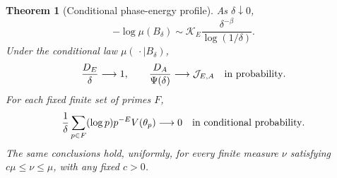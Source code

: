 \documentclass[11pt,letterpaper]{article}
\newtheorem{theorem}{Theorem}[section]
\theoremstyle{definition}
\theoremstyle{remark}
\newcommand{\1}{\mathbf 1}
\begin{document}
\begin{theorem}[Conditional phase-energy profile]
\label{p04:thm:conditional-energy-profile}
As $\delta\downarrow0$,
\begin{equation}\label{p04:eq:exact-E-entropy}
 -\log\mu(B_\delta)
 \sim\mathcal K_E\frac{\delta^{-\beta}}{\log(1/\delta)}.
\end{equation}
Under the conditional law $\mu(\,\cdot\mid B_\delta)$,
\begin{equation}\label{p04:eq:conditional-energy-profile}
 \frac{D_E}{\delta}\longrightarrow1,\qquad
 \frac{D_A}{\Psi(\delta)}\longrightarrow\mathcal J_{E,A}
 \quad\hbox{in probability}.
\end{equation}
For each fixed finite set of primes $F$,
\begin{equation}\label{p04:eq:fixed-primes-negligible}
 \frac1\delta\sum_{p\in F}(\log p)p^{-E}V(\theta_p)
 \longrightarrow0\quad\hbox{in conditional probability}.
\end{equation}
The same conclusions hold, uniformly, for every finite measure
$\nu$ satisfying $c\mu\le\nu\le\mu$, with any fixed $c>0$.
\end{theorem}
\end{document}
